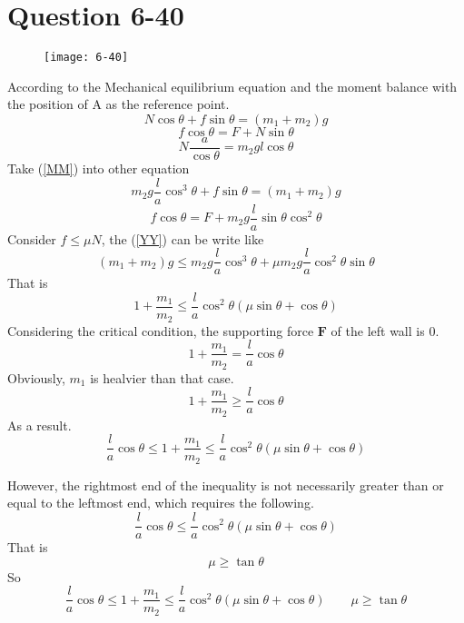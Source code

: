 \documentclass[12pt,a4paper]{article}%
\begin{document}
	\section{Question 6-40}
	\begin{figure}[H]
		\centering
		\texttt{[image: 6-40]}
		\caption*{}
		\label{fig:6-40}
	\end{figure}
	\noindent According to the Mechanical equilibrium equation and the moment balance with the position of A as the reference point.
	\begin{equation}
		N\cos\theta+f\sin\theta=(m_1+m_2)g
	\end{equation}
	\begin{equation}
		f\cos\theta=F+N\sin\theta
	\end{equation}
	\begin{equation}
		N\frac{a}{\cos\theta}=m_2gl\cos\theta
		\label{MM}
	\end{equation}
	Take (\ref{MM}) into other equation
	\begin{equation}
		m_2g\frac{l}{a}\cos^3\theta+f\sin\theta=(m_1+m_2)g
		\label{YY}
	\end{equation}
	\begin{equation}
		f\cos\theta=F+m_2g\frac{l}{a}\sin\theta\cos^2\theta
	\end{equation}
	Consider $f\leqslant\mu N$, the (\ref{YY}) can be write like
	\begin{equation}
		(m_1+m_2)g\leqslant m_2g\frac{l}{a}\cos^3\theta+\mu m_2g\frac{l}{a}\cos^2\theta\sin\theta
	\end{equation}
	That is
	\begin{equation}
		1+\frac{m_1}{m_2}\leqslant\frac{l}{a}\cos^2\theta(\mu\sin\theta+\cos\theta)
	\end{equation}
	Considering the critical condition, the supporting force $\boldsymbol{F}$ of the left wall is 0.
	\begin{equation}
		1+\frac{m_1}{m_2}=\frac{l}{a}\cos\theta
	\end{equation}
	Obviously, $m_1$ is healvier than that case.
	\begin{equation}
		1+\frac{m_1}{m_2}\geqslant\frac{l}{a}\cos\theta
	\end{equation}
	As a result.
	\begin{equation}
			\frac{l}{a}\cos\theta\leqslant1+\frac{m_1}{m_2}\leqslant\frac{l}{a}\cos^2\theta(\mu\sin\theta+\cos\theta)
	\end{equation}

	However, the rightmost end of the inequality is not necessarily greater than or equal to the leftmost end, which requires the following.
	\begin{equation}
		\frac{l}{a}\cos\theta\leqslant\frac{l}{a}\cos^2\theta(\mu\sin\theta+\cos\theta)
	\end{equation}
	That is
	\begin{equation}
	\mu\geqslant\tan\theta
	\end{equation}
	So
	$$
	\frac{l}{a}\cos\theta\leqslant1+\frac{m_1}{m_2}\leqslant\frac{l}{a}\cos^2\theta(\mu\sin\theta+\cos\theta)\qquad\mu\geqslant\tan\theta
	$$
\end{document}
